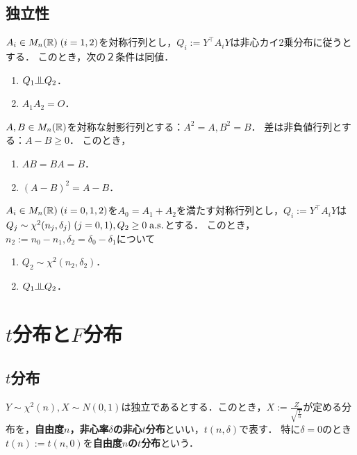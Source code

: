 \documentclass[uplatex,dvipdfmx]{jsreport}
\begin{document}
\subsection{独立性}

\begin{corollary}
    $A_i\in M_n(\mathbb{R})\;(i=1,2)$を対称行列とし，$Q_i:=Y^\top A_iY$は非心カイ2乗分布に従うとする．
    このとき，次の２条件は同値．
    \begin{enumerate}
        \item $Q_1\indep Q_2$．
        \item $A_1A_2=O$．
    \end{enumerate}
\end{corollary}

\begin{lemma}
    $A,B\in M_n(\mathbb{R})$を対称な射影行列とする：$A^2=A,B^2=B$．
    差は非負値行列とする：$A-B\ge 0$．
    このとき，
    \begin{enumerate}
        \item $AB=BA=B$．
        \item $(A-B)^2=A-B$．
    \end{enumerate}
\end{lemma}

\begin{theorem}
    $A_i\in M_n(\mathbb{R})\;(i=0,1,2)$を$A_0=A_1+A_2$を満たす対称行列とし，$Q_i:=Y^\top A_iY$は$Q_j\sim\chi^2(n_j,\delta_j)\;(j=0,1),Q_2\ge0\;\mathrm{a.s.}$とする．
    このとき，$n_2:=n_0-n_1,\delta_2=\delta_0-\delta_1$について
    \begin{enumerate}
        \item $Q_2\sim\chi^2(n_2,\delta_2)$．
        \item $Q_1\indep Q_2$．
    \end{enumerate}
\end{theorem}

\section{$t$分布と$F$分布}

\subsection{$t$分布}

\begin{definition}
    $Y\sim\chi^2(n),X\sim N(0,1)$は独立であるとする．このとき，$X:=\frac{Z}{\sqrt{\frac{Y}{n}}}$が定める分布を，\textbf{自由度$n$，非心率$\delta$の非心$t$分布}といい，$t(n,\delta)$で表す．
    特に$\delta=0$のとき$t(n):=t(n,0)$を\textbf{自由度$n$の$t$分布}という．
\end{definition}
\end{document}
